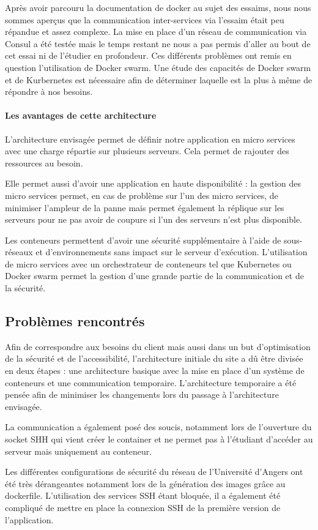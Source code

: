 \par Après avoir parcouru la documentation de docker au sujet des essaims, nous nous sommes aperçus que la communication inter-services via l’\gls{essaim} était peu répandue et assez complexe. La mise en place d’un réseau de communication via Consul a été testée mais le temps restant ne nous a pas permis d’aller au bout de cet essai ni de l’étudier en profondeur. Ces différents problèmes ont remis en question l’utilisation de Docker swarm. Une étude des capacités de Docker swarm et de Kurbernetes est nécessaire afin de déterminer laquelle est la plus à même de répondre à nos besoins.

\paragraph{Les avantages de cette architecture}

\par L'architecture envisagée permet de définir notre application en micro services avec une charge répartie sur plusieurs serveurs. Cela permet de rajouter des ressources au besoin. 
\par Elle permet aussi d’avoir une application en haute disponibilité : la gestion des micro services permet, en cas de problème sur l’un des micro services, de minimiser l'ampleur de la panne mais permet également la réplique sur les serveurs pour ne pas avoir de coupure si l’un des serveurs n’est plus disponible. 
\par Les conteneurs permettent d’avoir une sécurité supplémentaire à l’aide de sous-réseaux et d’environnements sans impact sur le serveur d’exécution. L’utilisation de micro services avec un orchestrateur de \gls{conteneur}s tel que Kubernetes ou Docker swarm permet la gestion d'une grande partie de la communication et de la sécurité.   

\subsection{Problèmes rencontrés} 

\par Afin de correspondre aux besoins du client mais aussi dans un but d'optimisation de la sécurité et de l'accessibilité, l’architecture initiale du site a dû être divisée en deux étapes : une architecture basique avec la mise en place d’un système de conteneurs et une communication temporaire. L’architecture temporaire a été pensée afin de minimiser les changements lors du passage à l’architecture envisagée. 
\par La communication a également posé des soucis, notamment lors de l’ouverture du socket SHH qui vient créer le container et ne permet pas à l’étudiant d'accéder au serveur mais uniquement au conteneur.

\par Les différentes configurations de sécurité du réseau de l’Université d’Angers ont été très dérangeantes notamment lors de la génération des images grâce au \gls{dockerfile}. L’utilisation des services SSH étant bloquée, il a également été compliqué de mettre en place la connexion SSH de la première version de l’application. 